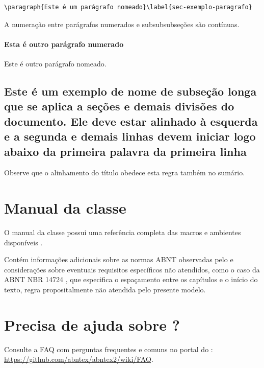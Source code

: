 \begin{verbatim}
\paragraph{Este é um parágrafo nomeado}\label{sec-exemplo-paragrafo}
\end{verbatim}

A numeração entre parágrafos numerados e subsubsubseções são contínuas.

\paragraph{Esta é outro parágrafo numerado}\label{sec-exemplo-paragrafo-outro}

Este é outro parágrafo nomeado.

\subsection{Este é um exemplo de nome de subseção longa que se aplica a seções e demais divisões do documento. Ele deve estar alinhado à esquerda e a segunda e demais linhas devem iniciar logo abaixo da primeira palavra da primeira linha} 

Observe que o alinhamento do título obedece esta regra também no sumário.
	

\section{Manual da classe \textsf{\abnTeX}}

O manual da classe \textsf{\abnTeX} possui uma referência completa das macros e ambientes disponíveis \cite{abnetxclasse}.

Contém informações adicionais sobre as normas ABNT
observadas pelo \textsf{\abnTeX} e considerações sobre eventuais requisitos específicos
não atendidos, como o caso da ABNT NBR 14724 \cite{nbr14724}, que
especifica o espaçamento entre os capítulos e o início do texto, regra
propositalmente não atendida pelo presente modelo.

\section{Precisa de ajuda sobre \textsf{\abnTeX}?}

Consulte a FAQ com perguntas frequentes e comuns no portal do \textsf{\abnTeX}:
\url{https://github.com/abntex/abntex2/wiki/FAQ}.

